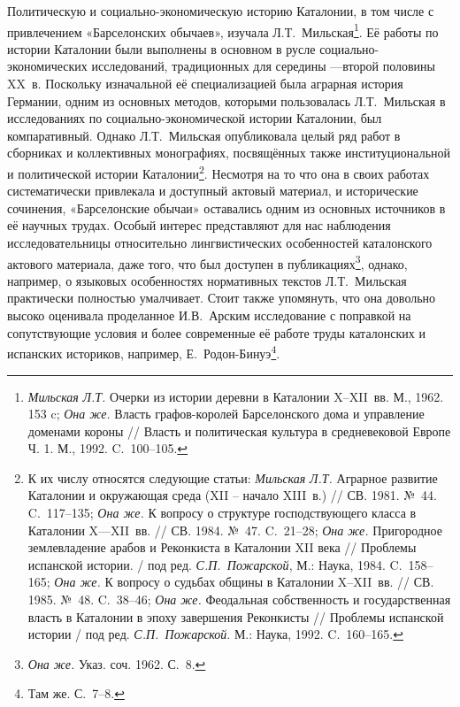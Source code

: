 Политическую и социально-экономическую историю Каталонии, в том числе с привлечением «Барселонских обычаев», изучала Л.Т.~Мильская\footnote{\emph{Мильская}\emph{ Л.Т.} Очерки из истории деревни в Каталонии X--XII~вв. М., 1962. 153 c; \emph{Она же.} Власть графов-королей Барселонского дома и управление доменами короны // Власть и политическая культура в средневековой Европе Ч. 1. М., 1992. C.~100--105.}. Её работы по истории Каталонии были выполнены в основном в русле социально-экономических исследований, традиционных для середины ---второй половины XX~в. Поскольку изначальной её специализацией была аграрная история Германии, одним из основных методов, которыми пользовалась Л.Т.~Мильская в исследованиях по социально-экономической истории Каталонии, был компаративный. Однако Л.Т.~Мильская опубликовала целый ряд работ в сборниках и коллективных монографиях, посвящённых также институциональной и политической истории Каталонии\footnote{К их числу относятся следующие статьи: \emph{Мильская}\emph{ Л.Т.} Аграрное развитие Каталонии и окружающая среда (XII -- начало XIII~в.) // СВ. 1981. №~44. C.~117--135; \emph{Она же.} К вопросу о структуре господствующего класса в Каталонии X---XII~вв. // СВ. 1984. №~47. C.~21--28; \emph{Она же.} Пригородное землевладение арабов и Реконкиста в Каталонии XII века // Проблемы испанской истории. / под ред. \emph{С.П.~Пожарской}, М.: Наука, 1984. C.~158--165; \emph{Она же.} К вопросу о судьбах общины в Каталонии X--XII~вв. // СВ. 1985. №~48. C.~38--46; \emph{Она же.} Феодальная собственность и государственная власть в Каталонии в эпоху завершения Реконкисты // Проблемы испанской истории / под ред. \emph{С.П.~Пожарской}. М.: Наука, 1992. C.~160--165.}. Несмотря на то что она в своих работах систематически привлекала и доступный актовый материал, и исторические сочинения, «Барселонские обычаи» оставались одним из основных источников в её научных трудах. Особый интерес представляют для нас наблюдения исследовательницы относительно лингвистических особенностей каталонского актового материала, даже того, что был доступен в публикациях\footnote{\emph{Она же.} Указ. соч. 1962. С.~8.}, однако, например, о языковых особенностях нормативных текстов Л.Т.~Мильская практически полностью умалчивает. Стоит также упомянуть, что она довольно высоко оценивала проделанное И.В.~Арским исследование с поправкой на сопутствующие условия и более современные её работе труды каталонских и испанских историков, например, Е.~Родон-Бинуэ\footnote{Там же. С.~7--8.}.

